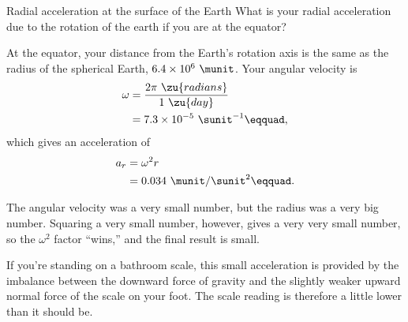 \begin{eg}{Radial acceleration at the surface of the Earth}
\egquestion
What is your radial acceleration due to the
rotation of the earth if you are at the equator?

\eganswer
At the equator, your distance from the Earth's
rotation axis is the same as the radius of the spherical
Earth, $ 6.4\times10^6\ \munit$. Your angular velocity
is
\begin{align*}
                \omega &= \frac{2\pi\ \zu{radians}}{1\ \zu{day}} \\
                        &=  7.3\times10^{-5}\ \sunit^{-1}\eqquad,
\end{align*}
which gives an acceleration of
\begin{align*}
        a_{r}        &=  \omega^2 r \\
        &=   0.034\ \munit/\sunit^2\eqquad.
\end{align*}

The angular velocity was a very small number, but the radius
was a very big number. Squaring a very small number,
however, gives a very very small number, so the $\omega^2$ factor
``wins,'' and the final result is small.

If you're
standing on a bathroom scale, this small acceleration is
provided by the imbalance between the downward force of
gravity and the slightly weaker upward normal force of the
scale on your foot. The scale reading is therefore a little
lower than it should be.
\end{eg}

